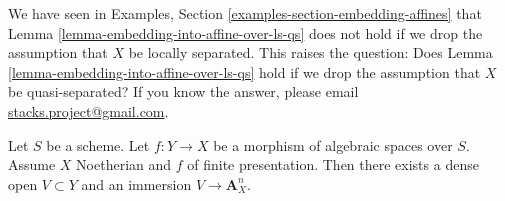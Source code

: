 \begin{remark}
\label{remark-cannot-embed-in-general}
We have seen in Examples, Section \ref{examples-section-embedding-affines}
that Lemma \ref{lemma-embedding-into-affine-over-ls-qs}
does not hold if we drop the assumption that $X$ be locally separated.
This raises the question: Does
Lemma \ref{lemma-embedding-into-affine-over-ls-qs}
hold if we drop the assumption that $X$ be quasi-separated?
If you know the answer, please email
\href{mailto:stacks.project@gmail.com}{stacks.project@gmail.com}.
\end{remark}

\begin{lemma}
\label{lemma-embedding-into-affine-over-qs}
Let $S$ be a scheme. Let $f : Y \to X$ be a morphism of algebraic
spaces over $S$. Assume $X$ Noetherian and $f$ of finite presentation.
Then there exists a dense open $V \subset Y$ and an immersion
$V \to \mathbf{A}^n_X$.
\end{lemma}


